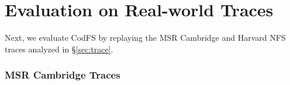 \section{Evaluation on Real-world Traces}
\label{eval:trace}

Next, we evaluate CodFS by replaying the MSR Cambridge and Harvard NFS traces
analyzed in \S\ref{sec:trace}.

\subsubsection {MSR Cambridge Traces}
